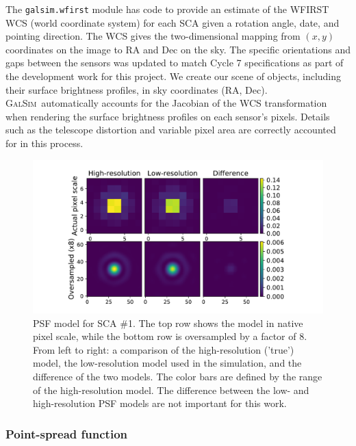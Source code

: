 \documentclass[aps,prd, amsmath,amssymb,superscriptaddress,showkeys,nofootinbib,reprint,preprintnumbers]{revtex4-1}
\newcommand{\galsim}{\textsc{GalSim}}
\begin{document}
The \texttt{galsim.wfirst} module has code to provide an estimate of the WFIRST WCS (world coordinate system) for each SCA given a rotation angle, date, and pointing direction.  
The WCS gives the two-dimensional mapping from $(x,y)$ coordinates on the image to RA and Dec on the sky.
The specific orientations and gaps between the sensors was updated to match Cycle 7 specifications as part of the development work for this project.
We create our scene of objects, including their surface brightness profiles, in sky coordinates (RA, Dec).
\galsim\ automatically accounts for the Jacobian of the WCS transformation when rendering the surface brightness profiles on each sensor's pixels.  
Details such as the telescope distortion and variable pixel area are correctly accounted for in this process.

\begin{figure}
\begin{center}
\includegraphics[width=\columnwidth]{figures/psf.pdf}
\end{center}
\caption[]{
PSF model for SCA \#1. The top row shows the model in native pixel scale, while the bottom row is oversampled by a factor of 8. From left to right: a comparison of the high-resolution ('true') model, the low-resolution model used in the simulation, and the difference of the two models. The color bars are defined by the range of the high-resolution model. The difference between the low- and high-resolution PSF models are not important for this work.
\label{fig:psf}}
\end{figure}

\subsubsection{Point-spread function}\label{psf}
\end{document}
